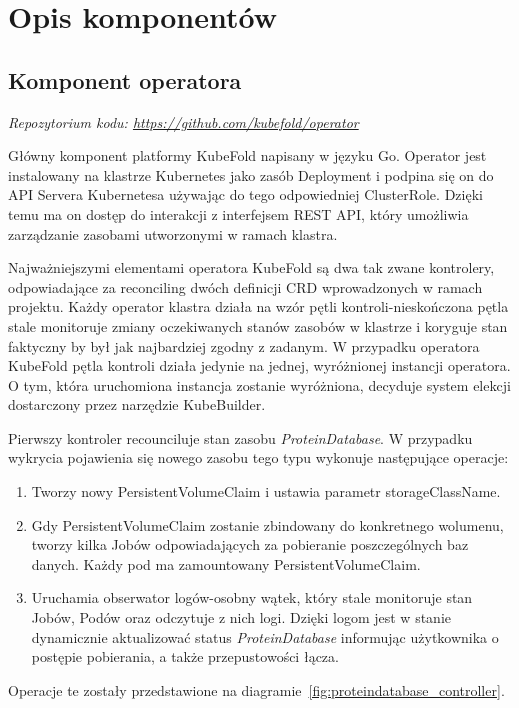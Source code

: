 \section{Opis komponentów}

\subsection{Komponent operatora}\label{subsec:component-operator}
\textit{Repozytorium kodu: \url{https://github.com/kubefold/operator}}

Główny komponent platformy KubeFold napisany w języku Go.
Operator jest instalowany na klastrze Kubernetes jako zasób Deployment i podpina się on do API Servera Kubernetesa używając do tego odpowiedniej ClusterRole.
Dzięki temu ma on dostęp do interakcji z interfejsem REST API, który umożliwia zarządzanie zasobami utworzonymi w ramach klastra.

Najważniejszymi elementami operatora KubeFold są dwa tak zwane kontrolery, odpowiadające za reconciling dwóch definicji CRD wprowadzonych w ramach projektu.
Każdy operator klastra działa na wzór pętli kontroli-nieskończona pętla stale monitoruje zmiany oczekiwanych stanów zasobów w klastrze i koryguje stan faktyczny by był jak najbardziej zgodny z zadanym.
W przypadku operatora KubeFold pętla kontroli działa jedynie na jednej, wyróżnionej instancji operatora.
O tym, która uruchomiona instancja zostanie wyróżniona, decyduje system elekcji dostarczony przez narzędzie KubeBuilder.

Pierwszy kontroler recounciluje stan zasobu \textit{ProteinDatabase}.
W przypadku wykrycia pojawienia się nowego zasobu tego typu wykonuje następujące operacje:
\begin{enumerate}
    \item Tworzy nowy PersistentVolumeClaim i ustawia parametr storageClassName.
    \item Gdy PersistentVolumeClaim zostanie zbindowany do konkretnego wolumenu, tworzy kilka Jobów odpowiadających za pobieranie poszczególnych baz danych.
    Każdy pod ma zamountowany PersistentVolumeClaim.
    \item Uruchamia obserwator logów-osobny wątek, który stale monitoruje stan Jobów, Podów oraz odczytuje z nich logi.
    Dzięki logom jest w stanie dynamicznie aktualizować status \textit{ProteinDatabase} informując użytkownika o postępie pobierania, a także przepustowości łącza.
\end{enumerate}
Operacje te zostały przedstawione na diagramie~\ref{fig:proteindatabase_controller}.

